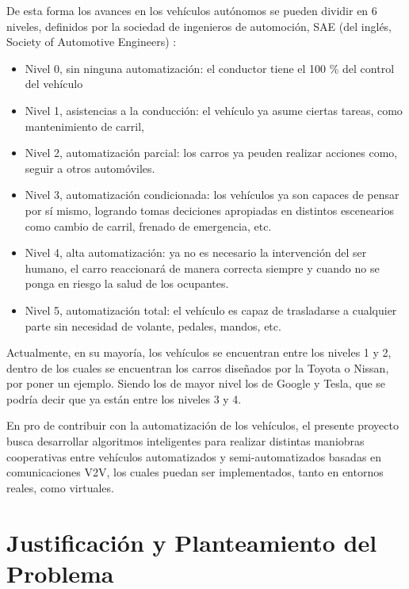 \par De esta forma los avances en los vehículos autónomos se pueden dividir en 6 niveles, definidos por la sociedad de ingenieros de automoción, SAE (del inglés, Society of Automotive Engineers) \cite{standard2014j3016}:
\begin{itemize}
\item Nivel 0, sin ninguna automatización: el conductor tiene el 100 \% del control del vehículo
\item Nivel 1, asistencias a la conducción: el vehículo ya asume ciertas tareas, como mantenimiento de carril,
\item Nivel 2, automatización parcial:  los carros ya peuden realizar acciones como, seguir a otros automóviles.
\item Nivel 3, automatización condicionada: los vehículos ya son capaces de pensar por sí mismo, logrando tomas deciciones apropiadas en distintos escenearios como cambio de carril, frenado de emergencia, etc.
\item Nivel 4, alta automatización: ya no es necesario la intervención del ser humano, el carro reaccionará de manera correcta siempre y cuando no se ponga en riesgo la salud de los ocupantes.
\item Nivel 5, automatización total: el vehículo es capaz de trasladarse a cualquier parte sin necesidad de volante, pedales, mandos, etc.\\ 
\end{itemize}

\par Actualmente, en su mayoría, los vehículos se encuentran entre los niveles 1 y 2, dentro de los cuales se encuentran los carros diseñados por la Toyota o Nissan, por poner un ejemplo. Siendo los de mayor nivel los de Google y Tesla, que se podría decir que ya están entre los niveles 3 y 4.\\

\par En pro de contribuir con la automatización de los vehículos, el presente proyecto busca desarrollar algoritmos inteligentes para realizar distintas maniobras cooperativas entre vehículos automatizados y semi-automatizados basadas en comunicaciones V2V, los cuales puedan ser implementados, tanto en entornos reales, como virtuales.

\section{Justificación y Planteamiento del Problema}


